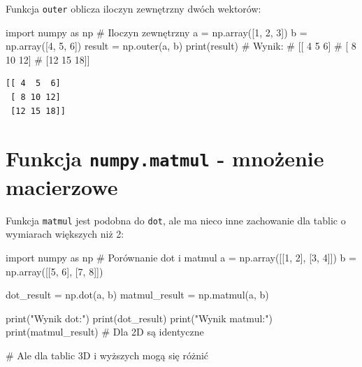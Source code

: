 \documentclass[
  letterpaper,
  DIV=11,
  numbers=noendperiod]{scrreprt}
\newenvironment{Shaded}{\begin{snugshade}}{\end{snugshade}}
\newcommand{\BuiltInTok}[1]{\textcolor[rgb]{0.00,0.23,0.31}{#1}}
\newcommand{\CommentTok}[1]{\textcolor[rgb]{0.37,0.37,0.37}{#1}}
\newcommand{\DecValTok}[1]{\textcolor[rgb]{0.68,0.00,0.00}{#1}}
\newcommand{\ImportTok}[1]{\textcolor[rgb]{0.00,0.46,0.62}{#1}}
\newcommand{\NormalTok}[1]{\textcolor[rgb]{0.00,0.23,0.31}{#1}}
\newcommand{\OperatorTok}[1]{\textcolor[rgb]{0.37,0.37,0.37}{#1}}
\newcommand{\StringTok}[1]{\textcolor[rgb]{0.13,0.47,0.30}{#1}}
\begin{document}
Funkcja \texttt{outer} oblicza iloczyn zewnętrzny dwóch wektorów:

\begin{Shaded}
\begin{Highlighting}[]
\ImportTok{import}\NormalTok{ numpy }\ImportTok{as}\NormalTok{ np}
\CommentTok{\# Iloczyn zewnętrzny}
\NormalTok{a }\OperatorTok{=}\NormalTok{ np.array([}\DecValTok{1}\NormalTok{, }\DecValTok{2}\NormalTok{, }\DecValTok{3}\NormalTok{])}
\NormalTok{b }\OperatorTok{=}\NormalTok{ np.array([}\DecValTok{4}\NormalTok{, }\DecValTok{5}\NormalTok{, }\DecValTok{6}\NormalTok{])}
\NormalTok{result }\OperatorTok{=}\NormalTok{ np.outer(a, b)}
\BuiltInTok{print}\NormalTok{(result)}
\CommentTok{\# Wynik:}
\CommentTok{\# [[ 4  5  6]}
\CommentTok{\#  [ 8 10 12]}
\CommentTok{\#  [12 15 18]]}
\end{Highlighting}
\end{Shaded}

\begin{verbatim}
[[ 4  5  6]
 [ 8 10 12]
 [12 15 18]]
\end{verbatim}

\section{\texorpdfstring{Funkcja \texttt{numpy.matmul} - mnożenie
macierzowe}{Funkcja numpy.matmul - mnożenie macierzowe}}\label{funkcja-numpy.matmul---mnoux17cenie-macierzowe}

Funkcja \texttt{matmul} jest podobna do \texttt{dot}, ale ma nieco inne
zachowanie dla tablic o wymiarach większych niż 2:

\begin{Shaded}
\begin{Highlighting}[]
\ImportTok{import}\NormalTok{ numpy }\ImportTok{as}\NormalTok{ np}
\CommentTok{\# Porównanie dot i matmul}
\NormalTok{a }\OperatorTok{=}\NormalTok{ np.array([[}\DecValTok{1}\NormalTok{, }\DecValTok{2}\NormalTok{], [}\DecValTok{3}\NormalTok{, }\DecValTok{4}\NormalTok{]])}
\NormalTok{b }\OperatorTok{=}\NormalTok{ np.array([[}\DecValTok{5}\NormalTok{, }\DecValTok{6}\NormalTok{], [}\DecValTok{7}\NormalTok{, }\DecValTok{8}\NormalTok{]])}

\NormalTok{dot\_result }\OperatorTok{=}\NormalTok{ np.dot(a, b)}
\NormalTok{matmul\_result }\OperatorTok{=}\NormalTok{ np.matmul(a, b)}

\BuiltInTok{print}\NormalTok{(}\StringTok{"Wynik dot:"}\NormalTok{)}
\BuiltInTok{print}\NormalTok{(dot\_result)}
\BuiltInTok{print}\NormalTok{(}\StringTok{"Wynik matmul:"}\NormalTok{)}
\BuiltInTok{print}\NormalTok{(matmul\_result)}
\CommentTok{\# Dla 2D są identyczne}

\CommentTok{\# Ale dla tablic 3D i wyższych mogą się różnić}
\end{Highlighting}
\end{Shaded}
\end{document}
